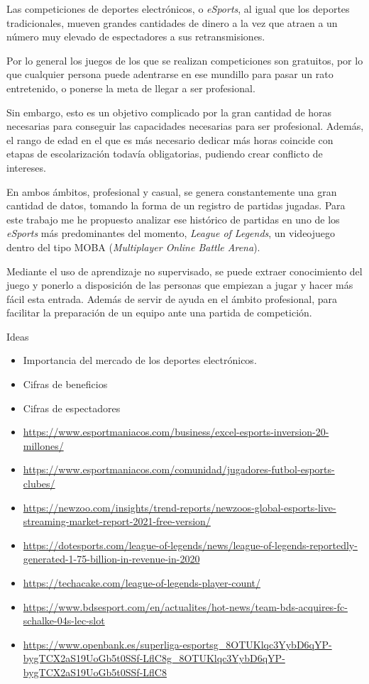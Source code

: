 
Las competiciones de deportes electrónicos, o \textit{eSports}, al igual que los deportes tradicionales, mueven grandes cantidades de dinero a la vez que atraen a un número muy elevado de espectadores a sus retransmisiones.

Por lo general los juegos de los que se realizan competiciones son gratuitos, por lo que cualquier persona puede adentrarse en ese mundillo para pasar un rato entretenido, o ponerse la meta de llegar a ser profesional.

Sin embargo, esto es un objetivo complicado por la gran cantidad de horas necesarias para conseguir las capacidades necesarias para ser profesional. Además, el rango de edad en el que es más necesario dedicar más horas coincide con etapas de escolarización todavía obligatorias, pudiendo crear conflicto de intereses.

En ambos ámbitos, profesional y casual, se genera constantemente una gran cantidad de datos, tomando la forma de un registro de partidas jugadas. Para este trabajo me he propuesto analizar ese histórico de partidas en uno de los \textit{eSports} más predominantes del momento, \textit{League of Legends}, un videojuego dentro del tipo MOBA (\textit{Multiplayer Online Battle Arena}).

Mediante el uso de aprendizaje no supervisado, se puede extraer conocimiento del juego y ponerlo a disposición de las personas que empiezan a jugar y hacer más fácil esta entrada. Además de servir de ayuda en el ámbito profesional, para facilitar la preparación de un equipo ante una partida de competición.

\hfill \break
Ideas
\sloppy
\begin{itemize}
    \item Importancia del mercado de los deportes electrónicos.
    \item Cifras de beneficios
    \item Cifras de espectadores
    \item \url{https://www.esportmaniacos.com/business/excel-esports-inversion-20-millones/}
    \item \url{https://www.esportmaniacos.com/comunidad/jugadores-futbol-esports-clubes/}
    \item \url{https://newzoo.com/insights/trend-reports/newzoos-global-esports-live-streaming-market-report-2021-free-version/}
    \item \url{https://dotesports.com/league-of-legends/news/league-of-legends-reportedly-generated-1-75-billion-in-revenue-in-2020}
    \item \url{https://techacake.com/league-of-legends-player-count/}
    \item \url{https://www.bdsesport.com/en/actualites/hot-news/team-bds-acquires-fc-schalke-04s-lec-slot}
    \item \url{https://www.openbank.es/superliga-esportsg_8OTUKlqc3YybD6qYP-bygTCX2aS19UoGb5t0SSf-LflC8g_8OTUKlqc3YybD6qYP-bygTCX2aS19UoGb5t0SSf-LflC8}
\end{itemize}